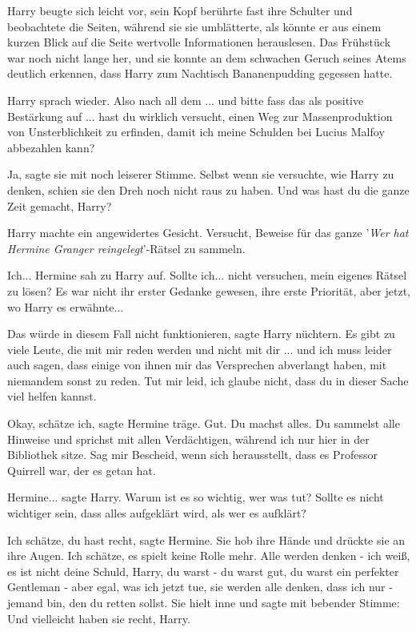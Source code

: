 Harry beugte sich leicht vor, sein Kopf berührte fast ihre Schulter und
beobachtete die Seiten, während sie sie umblätterte, als könnte er aus einem
kurzen Blick auf die Seite wertvolle Informationen herauslesen. Das Frühstück
war noch nicht lange her, und sie konnte an dem schwachen Geruch seines Atems
deutlich erkennen, dass Harry zum Nachtisch Bananenpudding gegessen hatte.

Harry sprach wieder. \glqq Also nach all dem ... und bitte fass das als positive
Bestärkung auf ... hast du wirklich versucht, einen Weg zur Massenproduktion von
Unsterblichkeit zu erfinden, damit ich meine Schulden bei Lucius Malfoy
abbezahlen kann?\grqq{}

\glqq Ja\grqq{}, sagte sie mit noch leiserer Stimme. Selbst wenn sie versuchte,
wie Harry zu denken, schien sie den Dreh noch nicht raus zu haben. \glqq Und was
hast du die ganze Zeit gemacht, Harry?\grqq{}

Harry machte ein angewidertes Gesicht. \glqq Versucht, Beweise für das ganze
'\emph{Wer hat Hermine Granger reingelegt}'-Rätsel zu sammeln.\grqq{}

\glqq Ich...\grqq{} Hermine sah zu Harry auf. \glqq Sollte ich... nicht
versuchen, mein eigenes Rätsel zu lösen?\grqq{} Es war nicht ihr erster Gedanke
gewesen, ihre erste Priorität, aber jetzt, wo Harry es erwähnte...

\glqq Das würde in diesem Fall nicht funktionieren\grqq{}, sagte Harry nüchtern.
\glqq Es gibt zu viele Leute, die mit mir reden werden und nicht mit dir ... und
ich muss leider auch sagen, dass einige von ihnen mir das Versprechen abverlangt
haben, mit niemandem sonst zu reden. Tut mir leid, ich glaube nicht, dass du in
dieser Sache viel helfen kannst.\grqq{}

\glqq Okay, schätze ich\grqq{}, sagte Hermine träge. \glqq Gut. Du machst alles.
Du sammelst alle Hinweise und sprichst mit allen Verdächtigen, während ich nur
hier in der Bibliothek sitze. Sag mir Bescheid, wenn sich herausstellt, dass es
Professor Quirrell war, der es getan hat.\grqq{}

\glqq Hermine...\grqq{} sagte Harry. \glqq Warum ist es so wichtig, wer was tut?
Sollte es nicht wichtiger sein, dass alles aufgeklärt wird, als wer es
aufklärt?\grqq{}

\glqq Ich schätze, du hast recht\grqq{}, sagte Hermine. Sie hob ihre Hände und
drückte sie an ihre Augen. \glqq Ich schätze, es spielt keine Rolle mehr. Alle
werden denken - ich weiß, es ist nicht deine Schuld, Harry, du warst - du warst
gut, du warst ein perfekter Gentleman - aber egal, was ich jetzt tue, sie werden
alle denken, dass ich nur - jemand bin, den du retten sollst.\grqq{} Sie hielt
inne und sagte mit bebender Stimme: \glqq Und vielleicht haben sie recht,
Harry.\grqq{}

